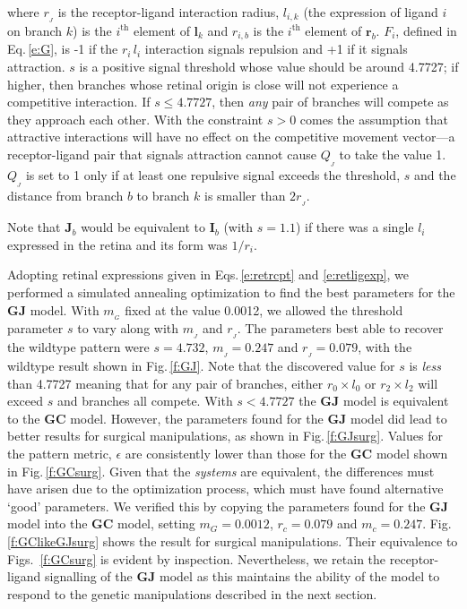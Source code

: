 \documentclass[11pt, a4paper]{article}
\begin{document}
where $r_{\!_J}$ is the receptor-ligand interaction radius, $l_{i,k}$ (the
expression of ligand $i$ on branch $k$) is the $i^{\mathrm{th}}$ element of
$\mathbf{l}_k$ and $r_{i,b}$ is the $i^{\mathrm{th}}$ element of
$\mathbf{r}_b$. $F_i$, defined in Eq.\,\ref{e:G}, is -1 if the $r_{i}\,l_{i}$
interaction signals repulsion and +1 if it signals attraction. $s$ is a
positive signal threshold whose value should be around 4.7727; if higher, then
branches whose retinal origin is close will not experience a competitive
interaction. If $s\leq 4.7727$, then \emph{any} pair of branches will compete
as they approach each other. With the constraint $s>0$ comes the assumption
that attractive interactions will have no effect on the competitive movement
vector---a receptor-ligand pair that signals attraction cannot cause
$Q_{\!_J}$ to take the value 1. $Q_{\!_J}$ is set to 1 only if at least one
repulsive signal exceeds the threshold, $s$ and the distance from branch $b$
to branch $k$ is smaller than $2 r_{\!_J}$.

Note that $\mathbf{J}_b$ would be equivalent to $\mathbf{I}_b$ (with $s=1.1$)
if there was a single $l_i$ expressed in the retina and its form was $1/r_i$.

Adopting retinal expressions given in Eqs.\,\ref{e:retrcpt}
and \ref{e:retligexp}, we performed a simulated annealing optimization to find
the best parameters for the $\mathbf{GJ}$ model.  With $m_{\!_G}$ fixed at the
value 0.0012, we allowed the threshold parameter $s$ to vary along with
$m_{\!_J}$ and $r_{\!_J}$. The parameters best able to recover the wildtype
pattern were $s=4.732$, $m_{\!_J} = 0.247$ and $r_{\!_J} = 0.079$, with the
wildtype result shown in Fig.\,\ref{f:GJ}. Note that the discovered value for
$s$ is \emph{less} than 4.7727 meaning that for any pair of branches, either
$r_0\times l_0$ or $r_2\times l_2$ will exceed $s$ and branches all
compete. With $s < 4.7727$ the $\mathbf{GJ}$ model is equivalent to the
$\mathbf{GC}$ model. However, the parameters found for the $\mathbf{GJ}$ model
did lead to better results for surgical manipulations, as shown in
Fig.\,\ref{f:GJsurg}. Values for the pattern metric, $\epsilon$ are
consistently lower than those for the $\mathbf{GC}$ model shown in
Fig.\,\ref{f:GCsurg}. Given that the \emph{systems} are equivalent, the
differences must have arisen due to the optimization process, which must have
found alternative `good' parameters. We verified this by copying the
parameters found for the $\mathbf{GJ}$ model into the $\mathbf{GC}$ model,
setting $m_G = 0.0012$, $r_c = 0.079$ and $m_c =
0.247$. Fig.\,\ref{f:GClikeGJsurg} shows the result for surgical
manipulations. Their equivalence to Figs.~\ref{f:GCsurg} is evident by
inspection. Nevertheless, we retain the receptor-ligand signalling of the
$\mathbf{GJ}$ model as this maintains the ability of the model to respond to
the genetic manipulations described in the next section.
\end{document}

